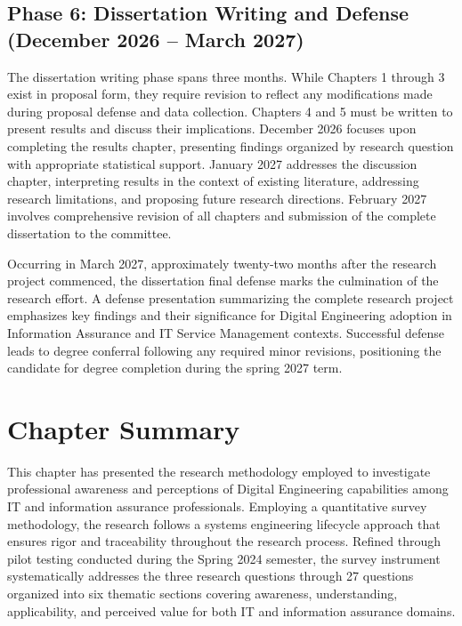 \subsection{Phase 6: Dissertation Writing and Defense (December 2026 -- March 2027)}

The dissertation writing phase spans three months. While Chapters 1 through 3 exist in proposal form, they require revision to reflect any modifications made during proposal defense and data collection. Chapters 4 and 5 must be written to present results and discuss their implications. December 2026 focuses upon completing the results chapter, presenting findings organized by research question with appropriate statistical support. January 2027 addresses the discussion chapter, interpreting results in the context of existing literature, addressing research limitations, and proposing future research directions. February 2027 involves comprehensive revision of all chapters and submission of the complete dissertation to the committee.

Occurring in March 2027, approximately twenty-two months after the research project commenced, the dissertation final defense marks the culmination of the research effort. A defense presentation summarizing the complete research project emphasizes key findings and their significance for Digital Engineering adoption in Information Assurance and IT Service Management contexts. Successful defense leads to degree conferral following any required minor revisions, positioning the candidate for degree completion during the spring 2027 term.

\section{Chapter Summary}

This chapter has presented the research methodology employed to investigate professional awareness and perceptions of Digital Engineering capabilities among IT and information assurance professionals. Employing a quantitative survey methodology, the research follows a systems engineering lifecycle approach that ensures rigor and traceability throughout the research process. Refined through pilot testing conducted during the Spring 2024 semester, the survey instrument systematically addresses the three research questions through 27 questions organized into six thematic sections covering awareness, understanding, applicability, and perceived value for both IT and information assurance domains.

